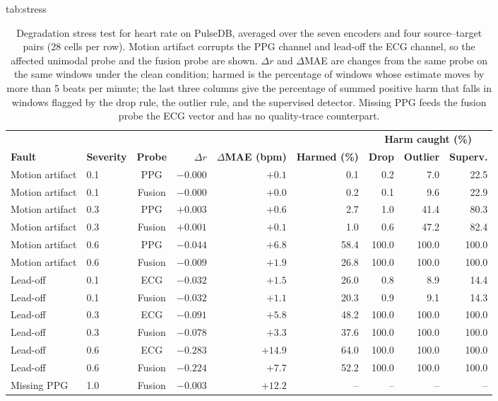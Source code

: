 \documentclass[pmlr,twocolumn,10pt]{jmlr}
\begin{document}
\begin{table}[t]
\floatconts
  {tab:stress}%
  {\caption{Degradation stress test for heart rate on PulseDB, averaged over the seven encoders and four source--target pairs (28 cells per row). Motion artifact corrupts the PPG channel and lead-off the ECG channel, so the affected unimodal probe and the fusion probe are shown. $\Delta r$ and $\Delta$MAE are changes from the same probe on the same windows under the clean condition; harmed is the percentage of windows whose estimate moves by more than 5 beats per minute; the last three columns give the percentage of summed positive harm that falls in windows flagged by the drop rule, the outlier rule, and the supervised detector. Missing PPG feeds the fusion probe the ECG vector and has no quality-trace counterpart.}}%
  {\footnotesize\setlength{\tabcolsep}{3pt}
  \begin{tabular*}{\linewidth}{@{\extracolsep{\fill}}llcrrrrrr@{}}
  \toprule
  & & & & & & \multicolumn{3}{c}{\textbf{Harm caught (\%)}} \\
  \cmidrule(lr){7-9}
  \textbf{Fault} & \textbf{Severity} & \textbf{Probe} & $\Delta r$ & $\Delta$\textbf{MAE (bpm)} & \textbf{Harmed (\%)} & \textbf{Drop} & \textbf{Outlier} & \textbf{Superv.} \\
  \midrule
  Motion artifact & 0.1 & PPG & $-0.000$ & $+0.1$ & 0.1 & 0.2 & 7.0 & 22.5 \\
  Motion artifact & 0.1 & Fusion & $-0.000$ & $+0.0$ & 0.2 & 0.1 & 9.6 & 22.9 \\
  Motion artifact & 0.3 & PPG & $+0.003$ & $+0.6$ & 2.7 & 1.0 & 41.4 & 80.3 \\
  Motion artifact & 0.3 & Fusion & $+0.001$ & $+0.1$ & 1.0 & 0.6 & 47.2 & 82.4 \\
  Motion artifact & 0.6 & PPG & $-0.044$ & $+6.8$ & 58.4 & 100.0 & 100.0 & 100.0 \\
  Motion artifact & 0.6 & Fusion & $-0.009$ & $+1.9$ & 26.8 & 100.0 & 100.0 & 100.0 \\
  \midrule
  Lead-off & 0.1 & ECG & $-0.032$ & $+1.5$ & 26.0 & 0.8 & 8.9 & 14.4 \\
  Lead-off & 0.1 & Fusion & $-0.032$ & $+1.1$ & 20.3 & 0.9 & 9.1 & 14.3 \\
  Lead-off & 0.3 & ECG & $-0.091$ & $+5.8$ & 48.2 & 100.0 & 100.0 & 100.0 \\
  Lead-off & 0.3 & Fusion & $-0.078$ & $+3.3$ & 37.6 & 100.0 & 100.0 & 100.0 \\
  Lead-off & 0.6 & ECG & $-0.283$ & $+14.9$ & 64.0 & 100.0 & 100.0 & 100.0 \\
  Lead-off & 0.6 & Fusion & $-0.224$ & $+7.7$ & 52.2 & 100.0 & 100.0 & 100.0 \\
  \midrule
  Missing PPG & 1.0 & Fusion & $-0.003$ & $+12.2$ & -- & -- & -- & -- \\
  \bottomrule
  \end{tabular*}}
\end{table}
\end{document}
